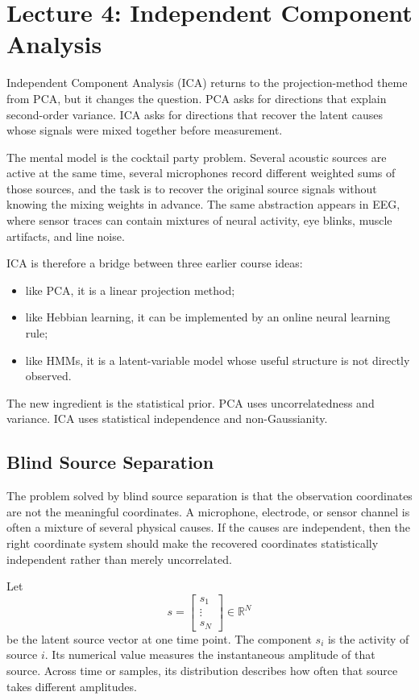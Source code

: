 \section{Lecture 4: Independent Component Analysis}

Independent Component Analysis (ICA) returns to the projection-method theme from PCA, but it changes the question. PCA asks for directions that explain second-order variance. ICA asks for directions that recover the latent causes whose signals were mixed together before measurement.

The mental model is the cocktail party problem. Several acoustic sources are active at the same time, several microphones record different weighted sums of those sources, and the task is to recover the original source signals without knowing the mixing weights in advance. The same abstraction appears in EEG, where sensor traces can contain mixtures of neural activity, eye blinks, muscle artifacts, and line noise.

ICA is therefore a bridge between three earlier course ideas:
\begin{itemize}
  \item like PCA, it is a linear projection method;
  \item like Hebbian learning, it can be implemented by an online neural learning rule;
  \item like HMMs, it is a latent-variable model whose useful structure is not directly observed.
\end{itemize}
The new ingredient is the statistical prior. PCA uses uncorrelatedness and variance. ICA uses statistical independence and non-Gaussianity.

\subsection{Blind Source Separation}

The problem solved by blind source separation is that the observation coordinates are not the meaningful coordinates. A microphone, electrode, or sensor channel is often a mixture of several physical causes. If the causes are independent, then the right coordinate system should make the recovered coordinates statistically independent rather than merely uncorrelated.

Let
\[
  s =
  \begin{bmatrix}
    s_1\\ \vdots\\ s_N
  \end{bmatrix}
  \in \mathbb{R}^N
\]
be the latent source vector at one time point. The component \(s_i\) is the activity of source \(i\). Its numerical value measures the instantaneous amplitude of that source. Across time or samples, its distribution describes how often that source takes different amplitudes.

